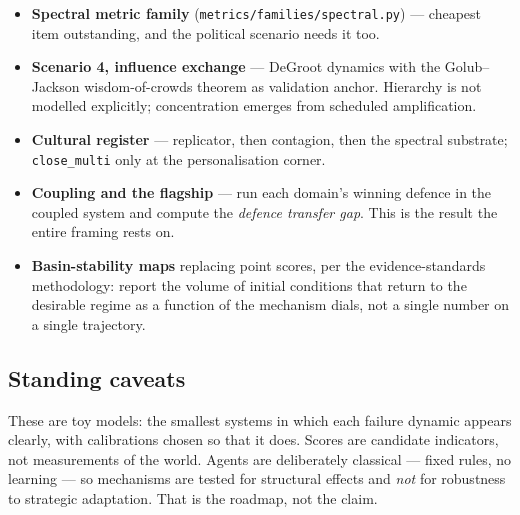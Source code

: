 \documentclass[11pt]{article}
\begin{document}
\begin{itemize}\itemsep2pt
\item \textbf{Spectral metric family} (\texttt{metrics/families/spectral.py}) --- cheapest
      item outstanding, and the political scenario needs it too.
\item \textbf{Scenario 4, influence exchange} --- DeGroot dynamics with the
      Golub--Jackson wisdom-of-crowds theorem as validation anchor. Hierarchy is not
      modelled explicitly; concentration emerges from scheduled amplification.
\item \textbf{Cultural register} --- replicator, then contagion, then the spectral
      substrate; \texttt{close\_multi} only at the personalisation corner.
\item \textbf{Coupling and the flagship} --- run each domain's winning defence in the coupled
      system and compute the \emph{defence transfer gap}. This is the result the entire
      framing rests on.
\item \textbf{Basin-stability maps} replacing point scores, per the evidence-standards
      methodology: report the volume of initial conditions that return to the desirable
      regime as a function of the mechanism dials, not a single number on a single
      trajectory.
\end{itemize}

\subsection{Standing caveats}

These are toy models: the smallest systems in which each failure dynamic appears clearly,
with calibrations chosen so that it does. Scores are candidate indicators, not measurements
of the world. Agents are deliberately classical --- fixed rules, no learning --- so
mechanisms are tested for structural effects and \emph{not} for robustness to strategic
adaptation. That is the roadmap, not the claim.
\end{document}
